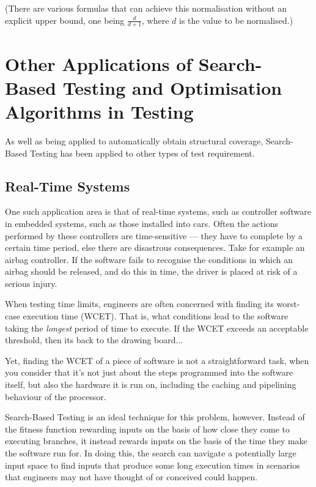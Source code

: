 
(There are various formulas that can achieve this normalisation without an
explicit upper bound, one being $\frac{d}{d+1}$, where $d$ is the value to be
normalised.)

\section{Other Applications of Search-Based Testing and Optimisation Algorithms
in Testing}

As well as being applied to automatically obtain structural coverage,
Search-Based Testing has been applied to other types of test requirement.


\subsection{Real-Time Systems}

One such application area is that of real-time systems, such as controller
software in embedded systems, such as those installed into cars. Often the
actions performed by these controllers are time-sensitive --- they have to
complete by a certain time period, else there are disastrous consequences. Take
for example an airbag controller. If the software fails to recognise the
conditions in which an airbag should be released, and do this in time, the
driver is placed at risk of a serious injury. 

When testing time limits, engineers are often concerned with finding its
worst-case execution time (WCET). That is, what conditions lead to the software
taking the {\it longest} period of time to execute. If the WCET exceeds an
acceptable threshold, then its back to the drawing board...

Yet, finding the WCET of a piece of software is not a straightforward task, when
you consider that it's not just about the steps programmed into the software
itself, but also the hardware it is run on, including the caching and pipelining
behaviour of the processor. 

Search-Based Testing is an ideal technique for this problem, however. Instead of
the fitness function rewarding inputs on the basis of how close they come to
executing branches, it instead rewards inputs on the basis of the time they make
the software run for. In doing this, the search can navigate a potentially large
input space to find inputs that produce some long execution times in scenarios
that engineers may not have thought of or conceived could happen.

